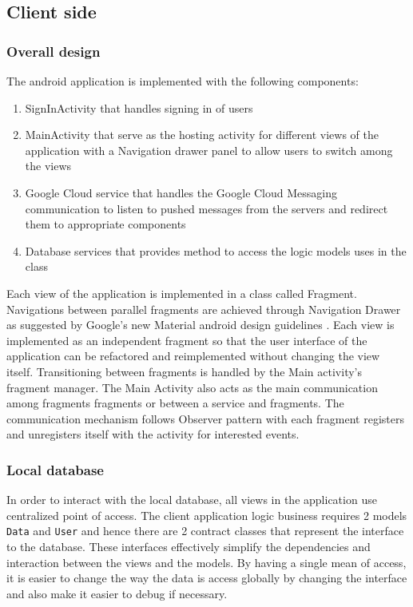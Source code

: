 \subsection{Client side}

\subsubsection{Overall design}
The android application is implemented with the following components:
\begin{enumerate}
    \item SignInActivity that handles signing in of users
    \item MainActivity that serve as the hosting activity for different views of the application with a Navigation
        drawer panel to allow users to switch among the views
    \item Google Cloud service that handles the Google Cloud Messaging communication to listen to pushed messages from
        the servers and redirect them to appropriate components
    \item Database services that provides method to access the logic models uses in the class
\end{enumerate}

Each view of the application is implemented in a class called Fragment.  Navigations between parallel fragments are
achieved through Navigation Drawer as suggested by Google's new Material android design guidelines
\cite{NavigationDrawerPattern}. Each view is implemented as an independent fragment so that the user interface of the
application can be refactored and reimplemented without changing the view itself.  Transitioning between fragments is
handled by the Main activity's fragment manager. The Main Activity also acts as the main communication among fragments
fragments or between a service and fragments. The communication mechanism follows Observer pattern
\cite{Gamma:1995:DPE:186897} with each fragment registers and unregisters itself with the activity for interested
events.

\subsubsection{Local database}
In order to interact with the local database, all views in the application use centralized point of access. The client
application logic business requires 2 models \texttt{Data} and \texttt{User} and hence there are 2 contract classes that
represent the interface to the database. These interfaces effectively simplify the dependencies and interaction between
the views and the models. By having a single mean of access, it is easier to change the way the data is access globally
by changing the interface and also make it easier to debug if necessary.

